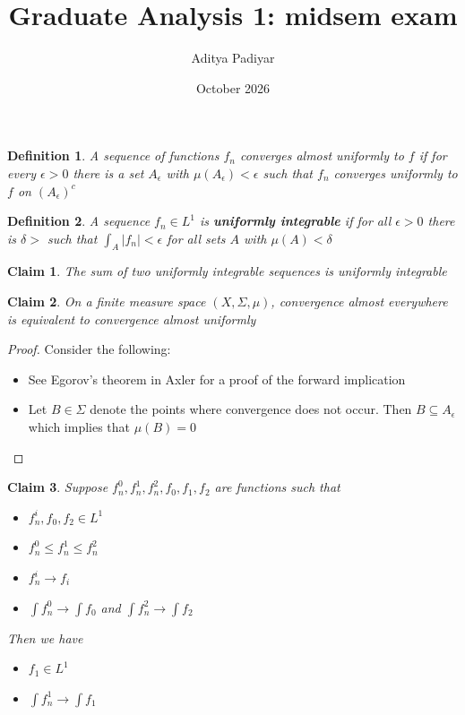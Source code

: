 \documentclass[a4paper,11pt]{article}
\title{Graduate Analysis 1: midsem exam}
\author{Aditya Padiyar}
\date{October 2026}
\newtheorem{claim}{Claim}
\newtheorem{definition}{Definition}
\begin{document}
\maketitle

\begin{definition}
  A sequence of functions $f_n$ converges almost uniformly to $f$ 
  if for every $\epsilon>0$ there is a set $A_\epsilon$ with $\mu(A_\epsilon)<\epsilon$ such that 
  $f_n$ converges uniformly to $f$ on $(A_\epsilon)^c$
\end{definition}

\begin{definition}
  A sequence $f_n \in L^1$ is \textbf{uniformly integrable} if 
  for all $\epsilon>0$ there is $\delta>$ such that $\int_A |f_n| < \epsilon$ for all sets $A$ with $\mu(A)<\delta$
\end{definition}

\begin{claim}\label{uniform_sum}
  The sum of two uniformly integrable sequences is uniformly integrable
\end{claim}

\begin{claim}
  On a finite measure space $(X,\Sigma,\mu)$, convergence almost everywhere is equivalent to convergence almost uniformly
\end{claim}

\begin{proof}
  Consider the following:
  \begin{itemize}
    \item See Egorov's theorem in Axler for a proof of the forward implication
    \item Let $B \in \Sigma$ denote the points where convergence does not occur. Then $B \subseteq A_\epsilon$ which implies that $\mu(B)=0$
  \end{itemize}
\end{proof}

\begin{claim}
  Suppose $f_n^0,f_n^1,f_n^2,f_0,f_1,f_2$ are functions such that 
  \begin{itemize}
    \item $f_n^i,f_0,f_2 \in L^1$ 
    \item $f_n^0 \leq f_n^1 \leq f_n^2$
    \item $f_n^i \to f_i$
    \item $\int f_n^0 \to \int f_0$ and $\int f_n^2 \to \int f_2$
  \end{itemize}
  
  Then we have 
  \begin{itemize}
    \item $f_1 \in L^1$ 
    \item $\int f_n^1 \to \int f_1$
  \end{itemize}
\end{claim}
\end{document}
